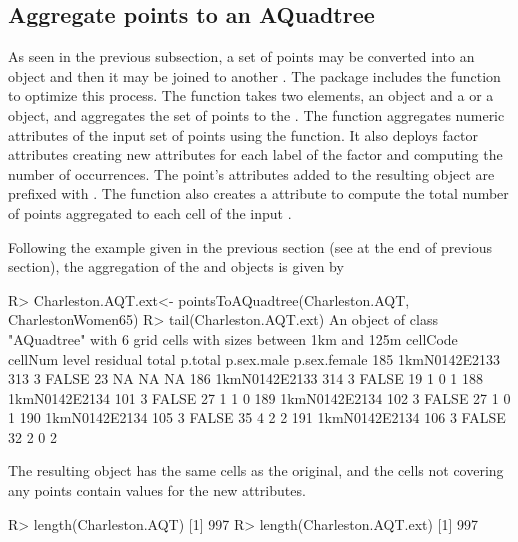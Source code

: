\subsection{Aggregate points to an AQuadtree} \label{sec:pt2qt}

As seen in the previous subsection, a set of points may be converted into an  object and then it may be joined to another . The package includes the  function to optimize this process. The function takes two elements, an  object and a  or a  object, and aggregates the set of points to the . The function aggregates numeric attributes of the input set of points using the  function. It also deploys factor attributes creating new attributes for each label of the factor and computing the number of occurrences. The point’s attributes added to the resulting  object are prefixed with . The function also creates a  attribute to compute the total number of points aggregated to each cell of the input .

Following the example given in the previous section (see at the end of previous section), the aggregation of the  and  objects is given by
%
\begin{example*}
R> Charleston.AQT.ext<- pointsToAQuadtree(Charleston.AQT, CharlestonWomen65)
R> tail(Charleston.AQT.ext)
An object of class "AQuadtree" with 6 grid cells with sizes between 1km and
125m 
       cellCode cellNum level residual total p.total p.sex.male p.sex.female
185 1kmN0142E2133   313     3    FALSE    23      NA         NA           NA
186 1kmN0142E2133   314     3    FALSE    19       1          0            1
188 1kmN0142E2134   101     3    FALSE    27       1          1            0
189 1kmN0142E2134   102     3    FALSE    27       1          0            1
190 1kmN0142E2134   105     3    FALSE    35       4          2            2
191 1kmN0142E2134   106     3    FALSE    32       2          0            2
\end{example*}
%
The resulting  object has the same cells as the original, and the cells not covering any points contain  values for the new attributes.
%
\begin{example*}
R> length(Charleston.AQT)
[1] 997
R> length(Charleston.AQT.ext)
[1] 997
\end{example*}
%


